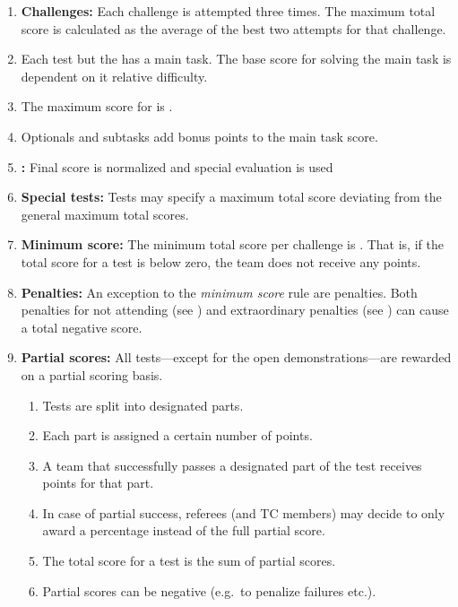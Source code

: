 \begin{enumerate}
	\item \textbf{Challenges:} Each challenge is attempted three times. The maximum total score is calculated as the average of the best two attempts for that challenge.

	\item Each test but the  has a main task. The base score for solving the main task is dependent on it relative difficulty. 
	\item The maximum score for  is .
	\item Optionals and subtasks add bonus points to the main task score.

	\item \textbf{:} Final score is normalized and special evaluation is used

	\item \textbf{Special tests:} Tests may specify a maximum total score deviating from the general maximum total scores.

	\item \textbf{Minimum score:} The minimum total score per challenge is . That is, if the total score for a test is below zero, the team does not receive any points.

	\item \textbf{Penalties:} An exception to the \emph{minimum score} rule are penalties. Both penalties for not attending (see ) and extraordinary penalties (see ) can cause a total negative score. 

	\item \textbf{Partial scores:} All tests---except for the open demonstrations---are rewarded on a partial scoring basis. 
	\begin{enumerate}
		\item Tests are split into designated parts.
		\item Each part is assigned a certain number of points.
		\item A team that successfully passes a designated part of the test receives points for that part.
		\item In case of partial success, referees (and TC members) may decide to only award a percentage instead of the full partial score.  
		\item The total score for a test is the sum of partial scores.
		\item Partial scores can be negative (e.g.~to penalize failures etc.).
	\end{enumerate}
\end{enumerate}


